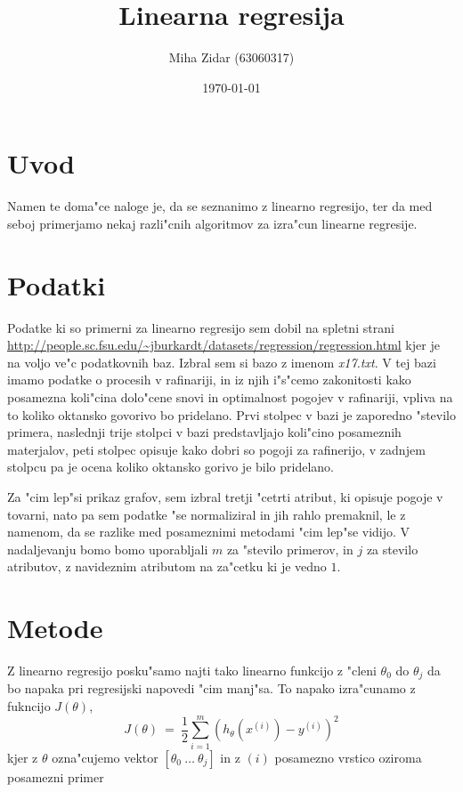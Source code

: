 \documentclass[a4paper,11pt]{article}
\title{Linearna regresija}
\author{Miha Zidar (63060317)}
\date{\today}
\begin{document}
\maketitle

\section{Uvod}

Namen te doma"ce naloge je, da se seznanimo z linearno regresijo, ter da med seboj primerjamo nekaj razli"cnih algoritmov za izra"cun linearne regresije.

\section{Podatki}

Podatke ki so primerni za linearno regresijo sem dobil na spletni strani \url{http://people.sc.fsu.edu/~jburkardt/datasets/regression/regression.html} kjer je na voljo ve"c podatkovnih baz. Izbral sem si bazo z imenom \textit{x17.txt}. V tej bazi imamo podatke o procesih v rafinariji, in iz njih i"s"cemo zakonitosti kako posamezna koli"cina dolo"cene snovi in optimalnost pogojev v rafinariji, vpliva na  to koliko oktansko govorivo bo pridelano. Prvi stolpec v bazi je zaporedno "stevilo primera, naslednji trije stolpci v bazi predstavljajo koli"cino posameznih materjalov, peti stolpec opisuje kako dobri so pogoji za rafinerijo, v zadnjem stolpcu pa je ocena koliko oktansko gorivo je bilo pridelano.

Za "cim lep"si prikaz grafov, sem izbral tretji "cetrti atribut, ki opisuje pogoje v tovarni, nato pa sem podatke "se normaliziral in jih rahlo premaknil, le z namenom, da se razlike med posameznimi metodami "cim lep"se vidijo. V nadaljevanju bomo bomo uporabljali $m$ za "stevilo primerov, in $j$ za stevilo atributov, z navideznim atributom na za"cetku ki je vedno $1$.

\section{Metode}

Z linearno regresijo posku"samo najti tako linearno funkcijo z "cleni $\theta_0$ do $\theta_j$ da bo napaka pri regresijski napovedi "cim manj"sa. To napako izra"cunamo z fukncijo $J(\theta)$, 
\[J(\theta) \ =\ \frac{1}{2} \sum_{i=1}^{m} (h_{\theta}(x^{(i)})-y^{(i)})^2 \]
kjer z $\theta$ ozna"cujemo vektor $[\theta_0 \ \ldots \ \theta_j]$ in z $(i)$ posamezno vrstico oziroma posamezni primer 
\end{document}

